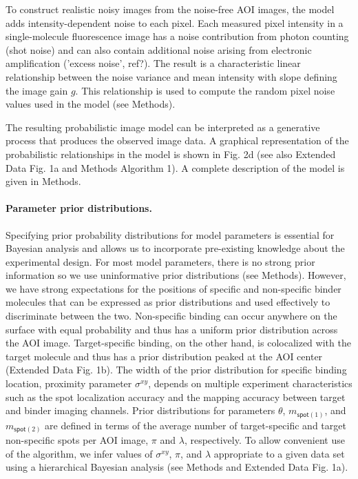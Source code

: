 To construct realistic noisy images from the noise-free AOI images, the model adds intensity-dependent noise to each pixel.  Each measured pixel intensity in a single-molecule fluorescence image has a noise contribution from photon counting (shot noise) and can also contain additional noise arising from electronic amplification ('excess noise', ref?). The result is a characteristic linear relationship between the noise variance and mean intensity with slope defining the image gain $g$. This relationship is used to compute the random pixel noise values used in the model (see Methods).

The resulting probabilistic image model can be interpreted as a generative process that produces the observed image data. A graphical representation of the probabilistic relationships in the model is shown in Fig. 2d (see also Extended Data Fig. 1a and Methods Algorithm 1). A complete description of the model is given in Methods.  



\paragraph{Parameter prior distributions.}
Specifying prior probability distributions for model parameters is essential for Bayesian analysis and allows us to incorporate pre-existing knowledge about the experimental design. For most model parameters, there is no strong prior information so we use uninformative prior distributions (see Methods). However, we have strong expectations for the positions of specific and non-specific binder molecules that can be expressed as prior distributions and used effectively to discriminate between the two. Non-specific binding can occur anywhere on the surface with equal probability and thus has a uniform prior distribution across the AOI image. Target-specific binding, on the other hand, is colocalized with the target molecule and thus has a prior distribution peaked at the AOI center (Extended Data Fig. 1b). The width of the prior distribution for specific binding location, proximity parameter $\sigma^{xy}$, depends on multiple experiment characteristics such as the spot localization accuracy and the mapping accuracy between target and binder imaging channels. Prior distributions for parameters $\theta$, $m_{\mathsf{spot}(1)}$, and $m_{\mathsf{spot}(2)}$ are defined in terms of the average number of target-specific and target non-specific spots per AOI image, $\pi$ and $\lambda$, respectively. To allow convenient use of the algorithm, we infer values of $\sigma^{xy}$, $\pi$, and $\lambda$ appropriate to a given data set using a hierarchical Bayesian analysis (see Methods and Extended Data Fig. 1a).

